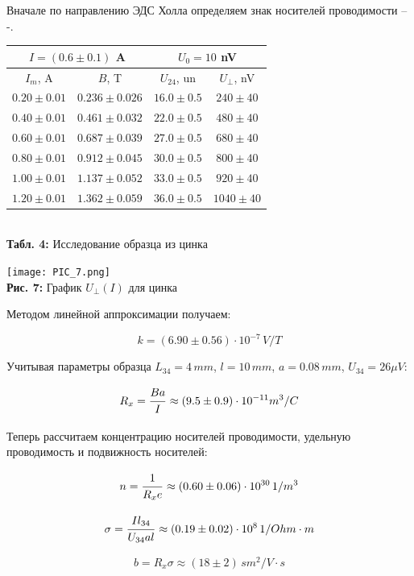 \documentclass[12pt,a4paper]{scrartcl}
\begin{document}
	Вначале по направлению ЭДС Холла определяем знак носителей проводимости -- -.

	\begin{center}
		\begin{tabular}{|c|c|c|c|}
			\hline
			\multicolumn{2}{|c|}{$I = (0.6 \pm 0.1)$ A} & \multicolumn{2}{|c|}{$U_0 = 10$ nV}
			\\\hline
			$I_m$, A & $B$, T & $U_{24}$, un & $U_\perp$, nV
			\\\hline
			$0.20 \pm 0.01$ & $0.236 \pm 0.026$ & $16.0 \pm 0.5$ & $240 \pm 40$
			\\\hline
			$0.40 \pm 0.01$ & $0.461 \pm 0.032$ & $22.0 \pm 0.5$ & $480 \pm 40$
			\\\hline
			$0.60 \pm 0.01$ & $0.687 \pm 0.039$ & $27.0 \pm 0.5$ & $680 \pm 40$
			\\\hline
			$0.80 \pm 0.01$ & $0.912 \pm 0.045$ & $30.0 \pm 0.5$ & $800 \pm 40$
			\\\hline
			$1.00 \pm 0.01$ & $1.137 \pm 0.052$ & $33.0 \pm 0.5$ & $920 \pm 40$
			\\\hline
			$1.20 \pm 0.01$ & $1.362 \pm 0.059$ & $36.0 \pm 0.5$ & $1040 \pm 40$
			\\\hline
		\end{tabular}	
		\\\textbf{Табл. 4:} Исследование образца из цинка
	\end{center}	
	
	\begin{center}
		\texttt{[image: PIC\_7.png]}
		\\\textbf{Рис. 7:} График $U_\perp(I)$ для цинка
	\end{center}
	
	Методом линейной аппроксимации получаем:
	
	$$k = (6.90 \pm 0.56) \cdot 10^{-7}\, V/T$$
	
	Учитывая параметры образца $L_{34} = 4\, mm$, $l = 10\, mm$, $a = 0.08\, mm$, $U_{34} = 26 \mu V$:

	$$R_x = \dfrac{\strut Ba}{\strut I} \approx (9.5 \pm 0.9) \cdot 10^{-11} m^3/C$$
	
	Теперь рассчитаем концентрацию носителей проводимости, удельную проводимость и подвижность носителей:
	
	$$n = \dfrac{\strut 1}{\strut R_xe} \approx (0.60 \pm 0.06) \cdot 10^{30}\, 1/m^3$$
	
	$$\sigma = \dfrac{\strut Il_{34}}{\strut U_{34}al} \approx (0.19 \pm 0.02) \cdot 10^8\, 1/Ohm \cdot m$$
	
	$$b = R_x\sigma \approx (18 \pm 2)\, sm^2/V\cdot s$$
	
\end{document}
